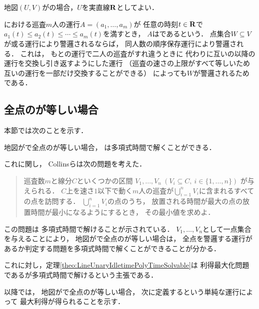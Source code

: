 \chapter{{\graphLine}}
\label{chapter: line}

地図$(U, V)$が{\graphLine}の場合，$U$を実直線$\mathbf R$としてよい．

{\graphLine}における巡査$m$人の運行$A = (a_1, \ldots, a_m)$が
任意の時刻$t \in \mathbf R$で
$a_1(t) \leq a_2(t) \leq \cdots \leq a_m(t)$を満すとき，
$A$はであるという．
点集合$W \subseteq V$が或る運行により警邏されるならば，
同人数の順序保存運行により警邏される．
これは，
もとの運行で二人の巡査がすれ違うときに
代わりに互いの以降の運行を交換し引き返すようにした運行
（巡査の速さの上限がすべて等しいため
互いの運行を一部だけ交換することができる）
によっても$W$が警邏されるためである．


\section{全点の{\maxIdletime}が等しい場合}
\label{section:LineUnaryIdletime}


本節では次のことを示す．

\begin{theo}
  \label{theo:LineUnaryIdletimePolyTimeSolvable}
  地図が{\graphLine}で全点の{\maxIdletime}が等しい場合，
  {\patProb}は多項式時間で解くことができる．
\end{theo}

これに関し，
Collinsら\cite{collins2013optimal}は次の問題を考えた．
\begin{quote}
  巡査数$m$と線分$C$といくつかの区間
  $V_1, \ldots, V_n\ (V_i \subseteq C,\ i \in \{1,\ldots, n\})$%
  が与えられる．
  $C$上を速さ$1$以下で動く$m$人の巡査が$\bigcup_{i = 1}^n V_i$に含まれるすべての点を訪問する．
  $\bigcup_{i = 1}^n V_i$の点のうち，
  放置される時間が最大の点の放置時間が最小になるようにするとき，
  その最小値を求めよ．
\end{quote}
この問題は
多項式時間で解けることが示されている\cite[Theorem~2.1]{collins2013optimal}．
$V_1, \ldots, V_n$として一点集合を与えることにより，
地図が{\graphLine}で全点の{\maxIdletime}が等しい場合は，
全点を警邏する運行があるか判定する問題を多項式時間で解くことができることが分かる．

これに対し，定理\ref{theo:LineUnaryIdletimePolyTimeSolvable}は
利得最大化問題である{\patProb}が多項式時間で解けるという主張である．

以降では，
地図が{\graphLine}で全点の{\maxIdletime}が等しい場合，
次に定義するという単純な運行によって
最大利得が得られることを示す．

